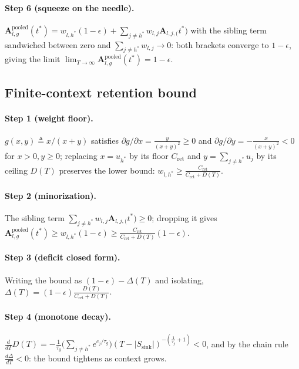 \documentclass[final,5p,times,twocolumn]{elsarticle}
\theoremstyle{definition}
\theoremstyle{remark}
\newcommand{\Attn}[2]{\mathbf{A}_{#1,#2}}
\newcommand{\AttnPool}[2]{\mathbf{A}^{\mathrm{pooled}}_{#1,#2}}
\newcommand{\Ssink}{S_{\mathrm{sink}}}
\begin{document}
\paragraph{Step 6 (squeeze on the needle).}
 $\AttnPool{l}{g}(t^{*}) = w_{l,h^{*}}(1-\epsilon) +
\sum_{j\neq h^{*}} w_{l,j}\Attn{l,j}(t^{*})$ with the sibling term
sandwiched between zero and $\sum_{j\neq h^{*}} w_{l,j} \to 0$: both
brackets converge to $1-\epsilon$, giving the limit
 $\lim_{T\to\infty}\AttnPool{l}{g}(t^{*}) = 1-\epsilon$.

\subsection{Finite-context retention bound}
\label{app:finite}

\paragraph{Step 1 (weight floor).}
 $g(x,y) \triangleq x/(x+y)$ satisfies
 $\partial g/\partial x = \frac{y}{(x+y)^2} \ge 0$ and
 $\partial g/\partial y = -\frac{x}{(x+y)^2} < 0$ for $x>0, y\ge0$;
replacing $x = u_{h^{*}}$ by its floor $C_{\mathrm{ret}}$ and
 $y = \sum_{j\neq h^{*}} u_j$ by its ceiling $D(T)$ preserves the lower
bound: $w_{l,h^{*}} \ge \frac{C_{\mathrm{ret}}}{C_{\mathrm{ret}} +
D(T)}$.

\paragraph{Step 2 (minorization).}
The sibling term $\sum_{j\neq h^{*}} w_{l,j}\Attn{l,j}(t^{*}) \ge 0$;
dropping it gives
 $\AttnPool{l}{g}(t^{*}) \ge w_{l,h^{*}}(1-\epsilon) \ge
\frac{C_{\mathrm{ret}}}{C_{\mathrm{ret}}+D(T)}(1-\epsilon)$.

\paragraph{Step 3 (deficit closed form).}
Writing the bound as $(1-\epsilon) - \Delta(T)$ and isolating,
 $\Delta(T) = (1-\epsilon)\frac{D(T)}{C_{\mathrm{ret}}+D(T)}$.

\paragraph{Step 4 (monotone decay).}
 $\frac{d}{dT}D(T) = -\frac{1}{\tau_g}
\bigl(\sum_{j\neq h^{*}}e^{c_j/\tau_g}\bigr)
(T-|\Ssink|)^{-(\frac{1}{\tau_g}+1)} < 0$, and by the chain rule
 $\frac{d\Delta}{dT} < 0$: the bound tightens as context grows.
\end{document}
